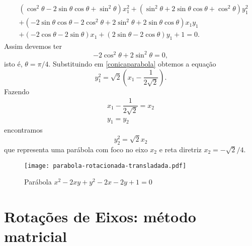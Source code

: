 \begin{exemplos}
\begin{enumerate}
\begin{solucao}
\begin{align}
        &(\cos^2\theta - 2\sin\theta\cos\theta + \sin^2\theta)x_1^2 + (\sin^2\theta + 2\sin\theta\cos\theta + \cos^2\theta)y_1^2\nonumber\\ &+ (-2\sin\theta\cos\theta - 2\cos^2\theta + 2\sin^2\theta + 2\sin\theta\cos\theta)x_1y_1\nonumber\\ &+ (-2\cos\theta - 2\sin\theta)x_1 + (2\sin\theta - 2\cos\theta)y_1 + 1 = 0.
      \end{align}
      Assim devemos ter
      \[
        -2\cos^2\theta + 2\sin^2\theta = 0,
      \]
      isto \'e, $\theta = \pi/4$. Substituindo em \eqref{conicaparabola} obtemos a equa\c{c}\~ao
      \[
        y_1^2 = \sqrt{2}\left(x_1 - \dfrac{1}{2\sqrt{2}}\right).
      \]
      Fazendo
      \begin{align*}
        x_1 - \dfrac{1}{2\sqrt{2}} = x_2\\
        y_1 = y_2
      \end{align*}
      encontramos
      \[
        y_2^2 = \sqrt{2}x_2
      \]
      que representa uma par\'abola com foco no eixo $x_2$ e reta diretriz $x_2 = -\sqrt{2}/4$.
      \begin{figure}[!h]
        \centering
        \caption{Par\'abola $x^2 - 2xy + y^2 - 2x - 2y + 1 = 0$}
        \texttt{[image: parabola-rotacionada-transladada.pdf]}
      \end{figure}
    \end{solucao}
  \end{enumerate}
\end{exemplos}


\section{Rotações de Eixos: método matricial} %
\label{sec:rotacoes_de_eixos_metodo_matricial}

